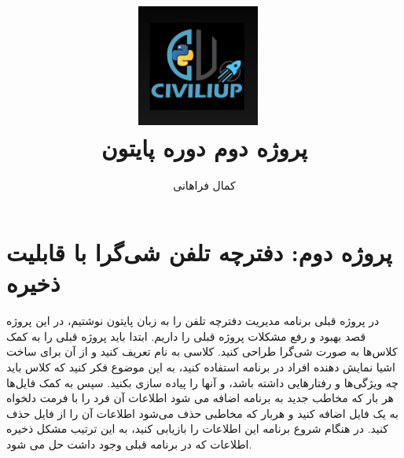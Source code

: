 \documentclass{article}
\begin{document}
	\title{%
		\includegraphics[width=0.3\textwidth]{pics/python_civiliup.jpg}~ 
		\\
		پروژه دوم دوره پایتون
	}
	\author{کمال فراهانی}
	\maketitle
	
	\section*{پروژه دوم: دفترچه تلفن شی‌گرا با قابلیت ذخیره}
	در پروژه قبلی برنامه مدیریت دفترچه تلفن را به زبان پایتون نوشتیم، در این پروژه قصد بهبود و رفع مشکلات پروژه قبلی را داریم. ابتدا باید پروژه قبلی را به کمک کلاس‌ها به صورت شی‌گرا طراحی کنید. کلاسی به نام
	تعریف کنید و از آن برای ساخت اشیا نمایش دهنده افراد در برنامه استفاده کنید، به این موضوع فکر کنید که کلاس 
	باید چه ویژگی‌ها و رفتارهایی داشته باشد، و آنها را پیاده سازی بکنید.
	سپس به کمک فایل‌ها هر بار که مخاطب جدید به برنامه اضافه می شود اطلاعات آن فرد را با فرمت دلخواه به یک فایل اضافه کنید و هربار که مخاطبی حذف می‌شود اطلاعات آن را از فایل حذف کنید. در هنگام شروع برنامه این اطلاعات را بازیابی کنید، به این ترتیب مشکل ذخیره اطلاعات که در برنامه قبلی وجود داشت حل می شود.
\end{document}
